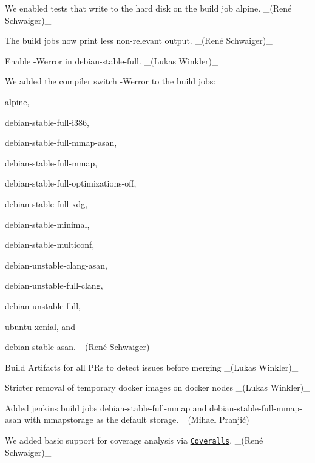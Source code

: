 \begin{DoxyItemize}
\item We enabled tests that write to the hard disk on the build job {\ttfamily alpine}. \+\_\+(René Schwaiger)\+\_\+
\item The build jobs now print less non-\/relevant output. \+\_\+(René Schwaiger)\+\_\+
\item Enable {\ttfamily -\/\+Werror} in {\ttfamily debian-\/stable-\/full}. \+\_\+(\+Lukas Winkler)\+\_\+
\item We added the compiler switch {\ttfamily -\/\+Werror} to the build jobs\+:
\begin{DoxyItemize}
\item {\ttfamily alpine},
\item {\ttfamily debian-\/stable-\/full-\/i386},
\item {\ttfamily debian-\/stable-\/full-\/mmap-\/asan},
\item {\ttfamily debian-\/stable-\/full-\/mmap},
\item {\ttfamily debian-\/stable-\/full-\/optimizations-\/off},
\item {\ttfamily debian-\/stable-\/full-\/xdg},
\item {\ttfamily debian-\/stable-\/minimal},
\item {\ttfamily debian-\/stable-\/multiconf},
\item {\ttfamily debian-\/unstable-\/clang-\/asan},
\item {\ttfamily debian-\/unstable-\/full-\/clang},
\item {\ttfamily debian-\/unstable-\/full},
\item {\ttfamily ubuntu-\/xenial}, and
\item {\ttfamily debian-\/stable-\/asan}. \+\_\+(René Schwaiger)\+\_\+
\end{DoxyItemize}
\item Build Artifacts for all PR\textquotesingle{}s to detect issues before merging \+\_\+(\+Lukas Winkler)\+\_\+
\item Stricter removal of temporary docker images on docker nodes \+\_\+(\+Lukas Winkler)\+\_\+
\item Added jenkins build jobs {\ttfamily debian-\/stable-\/full-\/mmap} and {\ttfamily debian-\/stable-\/full-\/mmap-\/asan} with {\ttfamily mmapstorage} as the default storage. \+\_\+(Mihael Pranjić)\+\_\+
\item We added basic support for coverage analysis via \href{http://coveralls.io}{\tt Coveralls}. \+\_\+(René Schwaiger)\+\_\+
\end{DoxyItemize}

